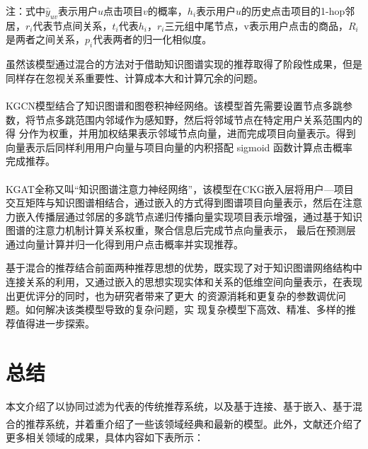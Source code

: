 \documentclass{article}
\newcommand{\upcite}[1]{\textsuperscript{\textsuperscript{\cite{#1}}}}
\begin{document}
	\small{注：式中$\hat{y}_{uv}$表示用户$u$点击项目$v$的概率，$h_i$表示用户$u$的历史点击项目的1-hop邻居，$r_i$代表节点间关系，$t_i$代表$h_i$，$r_i$三元组中尾节点，v表示用户点击的商品，$R_i$是两者之间关系，$p_i$代表两者的归一化相似度。
	
	\normalsize
	虽然该模型通过混合的方法对于借助知识图谱实现的推荐取得了阶段性成果，但是同样存在忽视关系重要性、计算成本大和计算冗余的问题。
	
	KGCN模型\upcite{13}结合了知识图谱和图卷积神经网络。该模型首先需要设置节点多跳参数，将节点多跳范围内邻域作为感知野，然后将邻域节点在特定用户关系范围内的得
	分作为权重，并用加权结果表示邻域节点向量，进而完成项目向量表示。得到向量表示后同样利用用户向量与项目向量的内积搭配 sigmoid 函数计算点击概率
	完成推荐。
	
	KGAT\upcite{14}全称又叫“知识图谱注意力神经网络”，该模型在CKG嵌入层将用户—项目交互矩阵与知识图谱相结合，通过嵌入的方式得到图谱项目向量表示，然后在注意力嵌入传播层通过邻居的多跳节点递归传播向量实现项目表示增强，通过基于知识图谱的注意力机制计算关系权重，聚合信息后完成节点向量表示，
	最后在预测层通过向量计算并归一化得到用户点击概率并实现推荐。
	
	基于混合的推荐结合前面两种推荐思想的优势，既实现了对于知识图谱网络结构中连接关系的利用，又通过嵌入的思想实现实体和关系的低维空间向量表示，在表现出更优评分的同时，也为研究者带来了更大
	的资源消耗和更复杂的参数调优问题。如何解决该类模型导致的复杂问题，实
	现复杂模型下高效、精准、多样的推荐值得进一步探索。
	
	\section{总结}
	本文介绍了以协同过滤为代表的传统推荐系统，以及基于连接、基于嵌入、基于混合的推荐系统，并着重介绍了一些该领域经典和最新的模型。此外，文献\upcite{1}还介绍了更多相关领域的成果，具体内容如下表所示：
	

}
\end{document}
